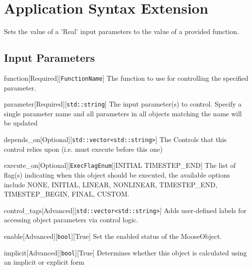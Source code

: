 
\chapter{\label{application-syntax-extension}Application Syntax Extension}
\par Sets the value of a 'Real' input parameters to the value of a provided function.
\section{\label{input-parameters}Input Parameters}
\begin{InputParameter}{function}[Required][\texttt{FunctionName}]
The function to use for controlling the specified parameter.
\end{InputParameter}

\begin{InputParameter}{parameter}[Required][\texttt{std::string}]
The input parameter(s) to control. Specify a single parameter name and all parameters in all objects matching the name will be updated
\end{InputParameter}

\begin{InputParameter}{depends\_on}[Optional][\texttt{std::vector{\textless}std::string{\textgreater}}]
The Controls that this control relies upon (i.e. must execute before this one)
\end{InputParameter}

\begin{InputParameter}{execute\_on}[Optional][\texttt{ExecFlagEnum}][INITIAL TIMESTEP\_END]
The list of flag(s) indicating when this object should be executed, the available options include NONE, INITIAL, LINEAR, NONLINEAR, TIMESTEP\_END, TIMESTEP\_BEGIN, FINAL, CUSTOM.
\end{InputParameter}

\begin{InputParameter}{control\_tags}[Advanced][\texttt{std::vector{\textless}std::string{\textgreater}}]
Adds user-defined labels for accessing object parameters via control logic.
\end{InputParameter}

\begin{InputParameter}{enable}[Advanced][\texttt{bool}][True]
Set the enabled status of the MooseObject.
\end{InputParameter}

\begin{InputParameter}{implicit}[Advanced][\texttt{bool}][True]
Determines whether this object is calculated using an implicit or explicit form
\end{InputParameter}

